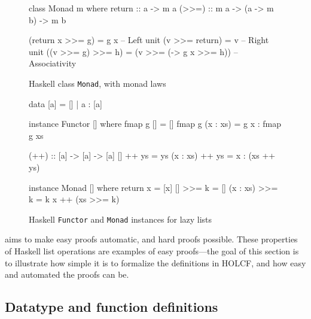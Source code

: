 \begin{figure}
\begin{center}
\begin{minipage}{0.90\textwidth}
\begin{hscode}
class Monad m where
  return :: a -> m a
  (>>=) :: m a -> (a -> m b) -> m b
\end{hscode}
\begin{hscode}
 (return x >>= g) = g x                        -- Left unit
   (v >>= return) = v                          -- Right unit
((v >>= g) >>= h) = (v >>= (\x -> g x >>= h))  -- Associativity
\end{hscode}
\end{minipage}
\end{center}
\caption{Haskell class \texttt{Monad}, with monad laws}
\label{fig:case-monad-laws}
\end{figure}

\begin{figure}
\begin{center}
\begin{minipage}{0.80\textwidth}
\begin{hscode}
data [a] = [] | a : [a]
\end{hscode}
\begin{hscode}
instance Functor [] where
  fmap g [] = []
  fmap g (x : xs) = g x : fmap g xs
\end{hscode}
\begin{hscode}
(++) :: [a] -> [a] -> [a]
[]       ++ ys = ys
(x : xs) ++ ys = x : (xs ++ ys)
\end{hscode}
\begin{hscode}
instance Monad [] where
  return x = [x]
  []       >>= k = []
  (x : xs) >>= k = k x ++ (xs >>= k)
\end{hscode}
\end{minipage}
\end{center}
\caption{Haskell \texttt{Functor} and \texttt{Monad} instances for lazy lists}
\label{fig:case-list-instances}
\end{figure}

 aims to make easy proofs automatic, and hard proofs possible. These properties of Haskell list operations are examples of easy proofs---the goal of this section is to illustrate how simple it is to formalize the definitions in HOLCF, and how easy and automated the proofs can be.

\subsection{Datatype and function definitions}
\label{sec:case-llist-definition}

